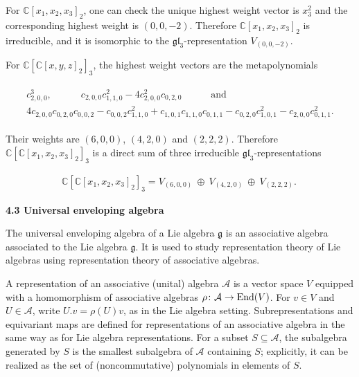 \documentclass[10pt,a4paper]{article}
\begin{document}
For $\mathbb{C}[x_{1},x_{2},x_{3}]_{2}$, one can check the unique highest weight vector is $x_{3}^{2}$ and the corresponding highest weight is $(0,0,-2)$. Therefore $\mathbb{C}[x_{1},x_{2},x_{3}]_{2}$ is irreducible, and it is isomorphic to the $\mathfrak{gl}_{3}$-representation $V_{(0,0,-2)}$.





For $\mathbb{C}[\mathbb{C}[x,y,z]_{2}]_{3}$, the highest weight vectors are the metapolynomials



\[\begin{aligned}
\begin{gathered}c_{2,0,0}^{3},\qquad\quad c_{2,0,0}c_{1,1,0}^{2}-4c_{2,0,0}^{2}c_{0,2,0}\qquad\quad\text{and}\\ 4c_{2,0,0}c_{0,2,0}c_{0,0,2}-c_{0,0,2}c_{1,1,0}^{2}+c_{1,0,1}c_{1,1,0}c_{0,1,1}-c_{0,2,0}c_{1,0,1}^{2}-c_{2,0,0}c_{0,1,1}^{2}.\end{gathered}
\end{aligned}\]


Their weights are $(6,0,0)$, $(4,2,0)$ and $(2,2,2)$. Therefore $\mathbb{C}[\mathbb{C}[x_{1},x_{2},x_{3}]_{2}]_{3}$ is a direct sum of three irreducible $\mathfrak{gl}_{3}$-representations



\[\begin{aligned}
\mathbb{C}[\mathbb{C}[x_{1},x_{2},x_{3}]_{2}]_{3}=V_{(6,0,0)}\ \oplus\ V_{(4,2,0)}\ \oplus\ V_{(2,2,2)}.\ 
\end{aligned}\]






\par\medskip\noindent\textbf{4.3 Universal enveloping algebra}\par




The universal enveloping algebra of a Lie algebra $\mathfrak{g}$ is an associative algebra associated to the Lie algebra $\mathfrak{g}$. It is used to study representation theory of Lie algebras using representation theory of associative algebras.





A representation of an associative (unital) algebra $\mathcal{A}$ is a vector space $V$ equipped with a homomorphism of associative algebras $\rho\colon\mathcal{A}\to\textnormal{End}(V)$. For $v\in V$ and $U\in\mathcal{A}$, write $U.v=\rho(U)v$, as in the Lie algebra setting. Subrepresentations and equivariant maps are defined for representations of an associative algebra in the same way as for Lie algebra representations. For a subset $S\subseteq\mathcal{A}$, the subalgebra generated by $S$ is the smallest subalgebra of $\mathcal{A}$ containing $S$; explicitly, it can be realized as the set of (noncommutative) polynomials in elements of $S$.
\end{document}
